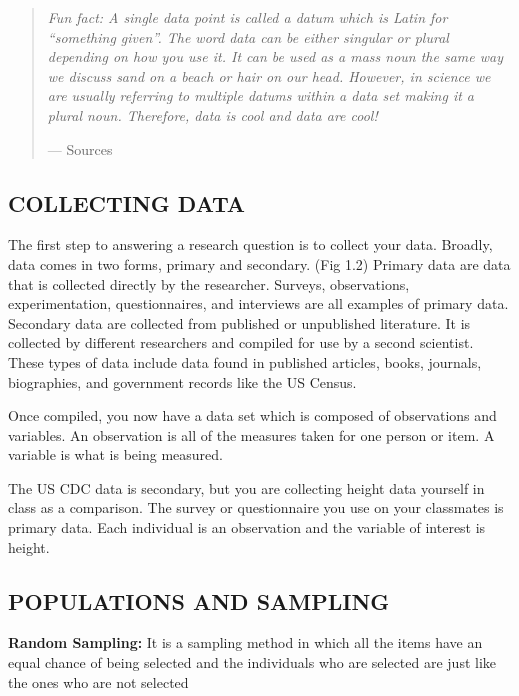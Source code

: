 \documentclass[
]{book}
\begin{document}
\begin{quote}
\emph{Fun fact: A single data point is called a datum which is Latin for ``something given''. The word data can be either singular or plural depending on how you use it. It can be used as a mass noun the same way we discuss sand on a beach or hair on our head. However, in science we are usually referring to multiple datums within a data set making it a plural noun. Therefore, data is cool and data are cool!}

--- Sources
\end{quote}

\hypertarget{collecting-data}{%
\subsection{COLLECTING DATA}\label{collecting-data}}

The first step to answering a research question is to collect your data. Broadly, data comes in two forms, primary and secondary. (Fig 1.2) Primary data are data that is collected directly by the researcher. Surveys, observations, experimentation, questionnaires, and interviews are all examples of primary data. Secondary data are collected from published or unpublished literature. It is collected by different researchers and compiled for use by a second scientist. These types of data include data found in published articles, books, journals, biographies, and government records like the US Census.

Once compiled, you now have a data set which is composed of observations and variables. An observation is all of the measures taken for one person or item. A variable is what is being measured.

The US CDC data is secondary, but you are collecting height data yourself in class as a comparison. The survey or questionnaire you use on your classmates is primary data. Each individual is an observation and the variable of interest is height.

\hypertarget{populations-and-sampling}{%
\subsection{POPULATIONS AND SAMPLING}\label{populations-and-sampling}}

\textbf{Random Sampling:} It is a sampling method in which all the items have an equal chance of being selected and the individuals who are selected are just like the ones who are not selected
\end{document}
